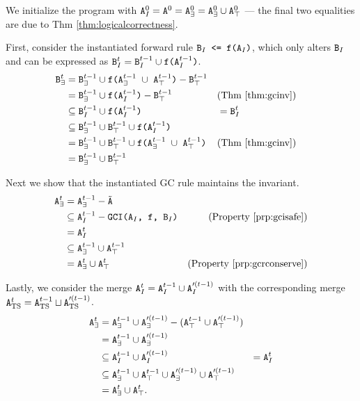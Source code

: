 \documentclass[10pt]{proc}
\numberwithin{equation}{section}
\newenvironment{proof}[1][Proof]{\begin{trivlist}\item[\hskip \labelsep {\textit {#1:}}]}{\end{trivlist}}
\renewcommand{\tt}[1]{\ifmmode\text{\texttt{#1}}\else\texttt{#1}\fi}
\begin{document}
\begin{proof}
We initialize the program with $\tt{A}_I^0 = \tt{A}^0 = \tt{A}_\exists^0 = \tt{A}_\exists^0 \cup \tt{A}_\top^0$ --- the final two equalities are due to Thm \ref{thm:logicalcorrectness}.

First, consider the instantiated forward rule $\tt{B}_I \tt{ <= f(A$_I$)}$, which only alters $\tt{B}_I$ and can be expressed as $\tt{B}_I^t = \tt{B}_I^{t-1} \cup \tt{f(A$_I^{t-1}$)}$.
\begin{align*}
\tt{B}_\exists^t
&= \tt{B}_\exists^{t-1} \cup \tt{f(A$_\exists^{t-1}$ $\cup$ A$_\top^{t-1}$)} - \tt{B}_\top^{t-1}\\
&= \tt{B}_\exists^{t-1} \cup \tt{f(A$_I^{t-1}$)} - \tt{B}_\top^{t-1} && \text{(Thm \ref{thm:gcinv})} \\
&\subseteq \tt{B}_I^{t-1} \cup \tt{f(A$_I^{t-1}$)}
&&= \tt{B}_I^t\\
&\subseteq \tt{B}_\exists^{t-1} \cup \tt{B}_\top^{t-1} \cup \tt{f(A$_I^{t-1}$)}\\
&=\tt{B}_\exists^{t-1} \cup \tt{B}_\top^{t-1} \cup \tt{f(A$_\exists^{t-1}$ $\cup$ A$_\top^{t-1}$)} && \text{(Thm \ref{thm:gcinv})}\\
&=\tt{B}_\exists^{t-1} \cup \tt{B}_\top^{t-1}
\end{align*}

Next we show that the instantiated GC rule maintains the invariant.
\begin{align*}
\tt{A}_\exists^t 
&= \tt{A}_\exists^{t-1} - \tilde{\tt{A}}\\
&\subseteq \tt{A}_I^{t-1} - \tt{GCI(A$_I$, f, B$_I$)} & \text{(Property \ref{prp:gcisafe})}\\
&= \tt{A}_I^t\\
&\subseteq \tt{A}_\exists^{t-1} \cup \tt{A}_\top^{t-1}\\
&= \tt{A}_\exists^t \cup \tt{A}_\top^t & \text{(Property \ref{prp:gcrconserve})}
\end{align*}

Lastly, we consider the merge $\tt{A}_I^t = \tt{A}_I^{t-1} \cup \tt{A}_I^{\prime(t-1)}$ with the corresponding merge $\tt{A}_\text{TS}^t = \tt{A}_\text{TS}^{t-1} \sqcup \tt{A}_\text{TS}^{\prime(t-1)}$.
\begin{align*}
\tt{A}_\exists^t
&= \tt{A}_\exists^{t-1} \cup \tt{A}_\exists^{\prime(t-1)} - (\tt{A}_\top^{t-1} \cup \tt{A}_\top^{\prime(t-1)})\\
&= \tt{A}_\exists^{t-1} \cup \tt{A}_\exists^{\prime(t-1)}\\
&\subseteq \tt{A}_I^{t-1} \cup \tt{A}_I^{\prime(t-1)}
&= \tt{A}_I^t\\
&\subseteq \tt{A}_\exists^{t-1} \cup \tt{A}_\top^{t-1} \cup \tt{A}_\exists^{\prime(t-1)} \cup \tt{A}_\top^{\prime(t-1)}\\
&= \tt{A}_\exists^t \cup \tt{A}_\top^t.
\end{align*}


\end{proof}
\end{document}
